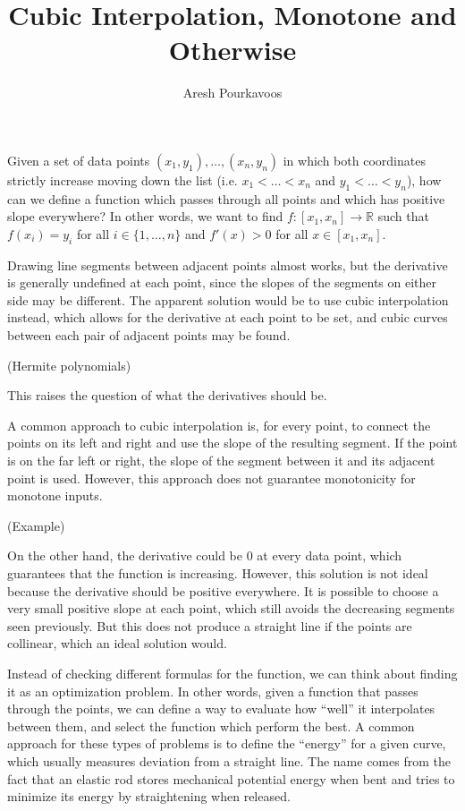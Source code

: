 \documentclass{article}
\begin{document}
\title{Cubic Interpolation, Monotone and Otherwise}
\author{Aresh Pourkavoos}
\maketitle

Given a set of data points $(x_1, y_1), \ldots, (x_n, y_n)$
in which both coordinates strictly increase moving down the list
(i.e. $x_1 < \ldots < x_n$ and $y_1 < \ldots < y_n$),
how can we define a function which passes through all points
and which has positive slope everywhere?
In other words, we want to find $f : [x_1, x_n] \rightarrow \mathbb{R}$
such that $f(x_i) = y_i$ for all $i \in \{1, \ldots, n\}$
and $f'(x) > 0$ for all $x \in [x_1, x_n]$.

Drawing line segments between adjacent points almost works,
but the derivative is generally undefined at each point,
since the slopes of the segments on either side may be different.
The apparent solution would be to use cubic interpolation instead,
which allows for the derivative at each point to be set,
and cubic curves between each pair of adjacent points may be found.

(Hermite polynomials)

This raises the question of what the derivatives should be.

A common approach to cubic interpolation
is, for every point,
to connect the points on its left and right
and use the slope of the resulting segment.
If the point is on the far left or right,
the slope of the segment between it and its adjacent point is used.
However, this approach does not guarantee monotonicity for monotone inputs.

(Example)

On the other hand, the derivative could be 0 at every data point,
which guarantees that the function is increasing.
However, this solution is not ideal because
the derivative should be positive everywhere.
It is possible to choose a very small positive slope at each point,
which still avoids the decreasing segments seen previously.
But this does not produce a straight line if the points are collinear,
which an ideal solution would.

Instead of checking different formulas for the function,
we can think about finding it as an optimization problem.
In other words, given a function that passes through the points,
we can define a way to evaluate how ``well'' it interpolates between them,
and select the function which perform the best.
A common approach for these types of problems is to define the ``energy'' for a given curve,
which usually measures deviation from a straight line.
The name comes from the fact that
an elastic rod stores mechanical potential energy when bent
and tries to minimize its energy by straightening when released.
\end{document}
